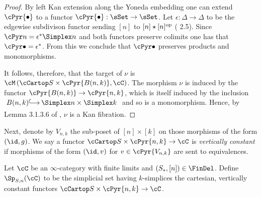 \documentclass[a4paper]{article}
\numberwithin{equation}{section}
\begin{document}
\begin{proof}
By left Kan extension along the Yoneda embedding one can extend $\cPyr{\bullet}$ to a functor $\cPyr {\bullet}: \sSet \to \sSet$. Let $\epsilon: \Delta \to \Delta$ to be the edgewise subdivison functor sending $[n]$ to $[n] \star [n]^{\rm op}$ (\cite{BarwickSpan} 2.5). Since $\cPyr n = \epsilon^*\Simplex n$ and both functors preserve colimits one has that $\cPyr\bullet = \epsilon^*$. From this we conclude that $\cPyr\bullet$ preserves products and monomorphisms.

It follows, therefore, that the target of $\nu$ is $\cM \left( \cCartop S \times \cPyr {B(n,k)}, \cC \right)$. The morphism $\nu$ is induced by the functor $\cPyr {B(n,k)} \to \cPyr {n,k}$, which is itself induced by the inclusion $\xymatrixcolsep{1pc}\xymatrix{B(n,k) \ar@{^{(}->}[r] & \Simplex n \times \Simplex k}$ and so is a monomorphism. Hence, by Lemma 3.1.3.6 of \cite{HTT}, $\nu$ is a Kan fibration.
\end{proof}

Next, denote by $V_{n,k}$ the sub-poset of $[n]\times[k]$ on those morphisms of the form $(\id,g)$. We say a functor $\cCartop S \times \cPyr {n,k} \to \cC$ is {\em vertically constant} if morphisms of the form $(\id, v)$ for $v \in \cPyr{V_{n,k}}$ are sent to equivalences.
\begin{defn}
\label{BispanqCat}
 Let $\cC$ be an $\infty$-category with finite limits and $(S_*,[n]) \in \FinDel$. Define $\Sp_{S,n}(\cC)$ to be the simplicial set having $k$-simplices the cartesian, vertically constant functors $\cCartop S \times \cPyr {n,k} \to \cC$.
\end{defn}
\end{document}
